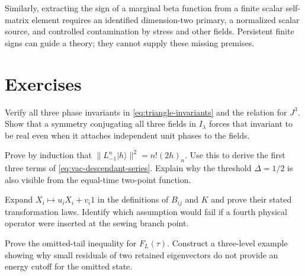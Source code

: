 Similarly, extracting the sign of a marginal beta function from a
finite scalar self-matrix element requires an identified dimension-two
primary, a normalized scalar source, and controlled contamination by
stress and other fields. Persistent finite signs can guide a theory;
they cannot supply these missing premises.

\section{Exercises}

\begin{exercise}\label{ex:overlap-phases}
Verify all three phase invariants in \eqref{eq:triangle-invariants}
and the relation for $J^3$. Show that a symmetry conjugating all three
fields in $I_\lambda$ forces that invariant to be real even when it
attaches independent unit phases to the fields.

\par\smallskip{}\par
\end{exercise}
\begin{exercise}\label{ex:overlap-descendant}
Prove by induction that $\|L_{-1}^n|h\rangle\|^2=n!(2h)_n$.
Use this to derive the first three terms of
\eqref{eq:vac-descendant-series}. Explain why the threshold
$\Delta=1/2$ is also visible from the equal-time two-point function.

\par\smallskip{}\par
\end{exercise}
\begin{exercise}\label{ex:overlap-cumulant}
Expand $X_i\mapsto u_iX_i+v_i1$ in the definitions of $B_{ij}$ and
$K$ and prove their stated transformation laws. Identify which
assumption would fail if a fourth physical operator were inserted
at the sewing branch point.

\par\smallskip{}\par
\end{exercise}
\begin{exercise}\label{ex:overlap-filter}
Prove the omitted-tail inequality for $F_L(\tau)$. Construct a
three-level example showing why small residuals of two retained
eigenvectors do not provide an energy cutoff for the omitted state.

\par\smallskip{}\par
\end{exercise}
